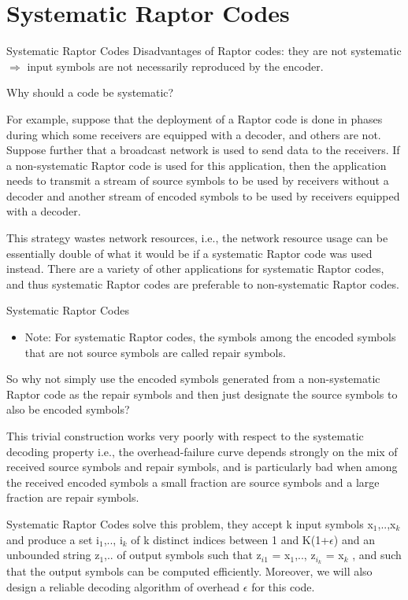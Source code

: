 \documentclass[handout,11pt]{beamer}
\begin{document}
\section{Systematic Raptor Codes}
\begin{frame}{Systematic Raptor Codes}
Disadvantages of Raptor codes: they are not systematic $\Rightarrow$ input symbols are not necessarily reproduced by the encoder.

Why should a code be systematic? 

For example, suppose that the deployment of a Raptor code is done in
phases during which some receivers are equipped with a decoder, and
others are not. Suppose further that a broadcast network is used to send
data to the receivers. If a non-systematic Raptor code is used for this
application, then the application needs to transmit a stream of source
symbols to be used by receivers without a decoder and another stream
of encoded symbols to be used by receivers equipped with a decoder.

This strategy wastes network resources, i.e., the network resource usage
can be essentially double of what it would be if a systematic Raptor
code was used instead. There are a variety of other applications for systematic Raptor codes, and thus systematic Raptor codes are preferable
to non-systematic Raptor codes.
\end{frame}
\begin{frame}{Systematic Raptor Codes}
\begin{itemize}
\item Note: For systematic Raptor codes, the symbols among the encoded symbols that are not source symbols are called repair symbols.
\end{itemize}
So why not simply use the encoded symbols generated from a non-systematic
Raptor code as the repair symbols and then just designate the source
symbols to also be encoded symbols?

This trivial construction works very poorly with respect to the systematic decoding property i.e., the overhead-failure curve depends
strongly on the mix of received source symbols and repair symbols, and
is particularly bad when among the received encoded symbols a small
fraction are source symbols and a large fraction are repair symbols.

Systematic Raptor Codes solve this problem, they accept k input
symbols x$_1$,..,x$_k$ and produce a set {i$_1$,.., i$_k$} of k distinct indices between 1 and K(1+$\epsilon$) and an unbounded string z$_1$,.. 
of output symbols such that z$_{i1}$ = x$_1$,.., z$_{i_k}$ = x$_k$ ,
and such that the output symbols can be computed efficiently.
Moreover, we will also design a reliable decoding algorithm of
overhead $\epsilon$ for this code.

\end{frame}
\end{document}
